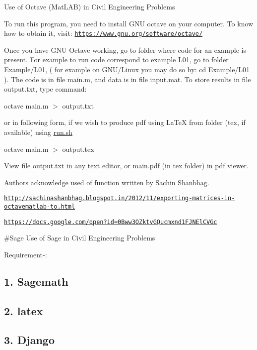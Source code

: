 Use of Octave (Mat\+L\+A\+B) in Civil Engineering Problems

To run this program, you need to install {\ttfamily G\+N\+U octave} on your computer. To know how to obtain it, visit\+: \href{https://www.gnu.org/software/octave/}{\tt https\+://www.\+gnu.\+org/software/octave/}

Once you have G\+N\+U Octave working, go to folder where code for an example is present. For example to run code correspond to example L01, go to folder Example/\+L01, ( for example on G\+N\+U/\+Linux you may do so by\+: {\ttfamily cd Example/\+L01} ). The code is in file {\ttfamily main.\+m}, and data is in file {\ttfamily input.\+mat}. To store results in file {\ttfamily output.\+txt}, type command\+:

{\ttfamily octave main.\+m $>$ output.\+txt}

or in following form, if we wish to produce pdf using La\+Te\+X from folder (tex, if available) using \hyperlink{run_8sh}{run.\+sh}

{\ttfamily octave main.\+m $>$ output.\+tex}

View file output.\+txt in any text editor, or main.\+pdf (in tex folder) in pdf viewer.

Authors acknowledge used of function written by Sachin Shanbhag.

\href{http://sachinashanbhag.blogspot.in/2012/11/exporting-matrices-in-octavematlab-to.html}{\tt http\+://sachinashanbhag.\+blogspot.\+in/2012/11/exporting-\/matrices-\/in-\/octavematlab-\/to.\+html}

\href{https://docs.google.com/open?id=0Bww3OZktvGQucmxnd1FJNElCVGc}{\tt https\+://docs.\+google.\+com/open?id=0\+Bww3\+O\+Zktv\+G\+Qucmxnd1\+F\+J\+N\+El\+C\+V\+Gc}

\#\+Sage Use of Sage in Civil Engineering Problems

Requirement-\/\+:

\subsection*{1. Sagemath}

\subsection*{2. latex}

\subsection*{3. Django}